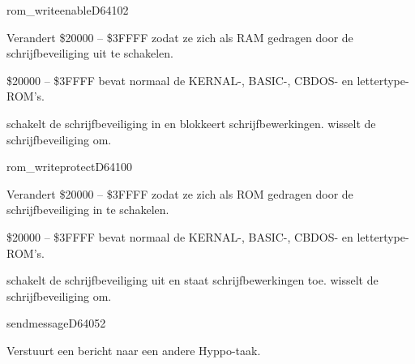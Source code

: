\newpage
\begin{hyppotrap}{rom\_writeenable}{D641}{02}

\item [Dienst:]  Verandert \$20000 -- \$3FFFF zodat ze zich als RAM gedragen door de  schrijfbeveiliging uit te schakelen.
\item [Geschiedenis:]
\item [Opmerkingen:]  \$20000 -- \$3FFFF bevat normaal de KERNAL-, BASIC-, CBDOS- en lettertype-ROM's.


   schakelt de schrijfbeveiliging in en blokkeert schrijfbewerkingen.   wisselt de schrijfbeveiliging om.
\end{hyppotrap}


\newpage
\begin{hyppotrap}{rom\_writeprotect}{D641}{00}

\item [Dienst:]  Verandert \$20000 -- \$3FFFF zodat ze zich als ROM gedragen door de  schrijfbeveiliging in te schakelen.
\item [Geschiedenis:]
\item [Opmerkingen:]  \$20000 -- \$3FFFF bevat normaal de KERNAL-, BASIC-, CBDOS- en lettertype-ROM's.


   schakelt de schrijfbeveiliging uit en staat schrijfbewerkingen toe.   wisselt de schrijfbeveiliging om.
\end{hyppotrap}


\newpage
\begin{hyppotrap}{sendmessage}{D640}{52}
\item [Dienst:]  Verstuurt een bericht naar een andere Hyppo-taak.
\notimplemented
\end{hyppotrap}



